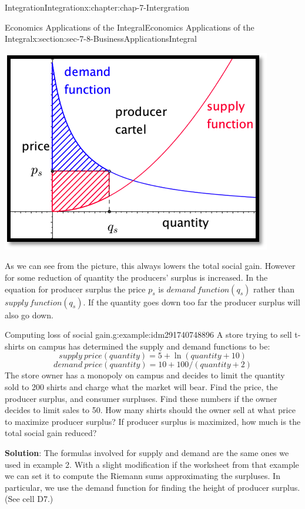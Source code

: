 \documentclass[oneside,10pt,]{book}
\newcommand{\terminology}[1]{\textbf{#1}}
\numberwithin{equation}{section}
\begin{document}
\begin{chapterptx}{Integration}{}{Integration}{}{}{x:chapter:chap-7-Intergration}
\begin{sectionptx}{Economics Applications of the Integral}{}{Economics Applications of the Integral}{}{}{x:section:sec-7-8-BusinessApplicationsIntegral}
\begin{sidebyside}{1}{0.2}{0.2}{0}
\begin{sbspanel}{0.6}
\includegraphics[width=\linewidth]{images/sec7-8-9.png}
\end{sbspanel}%
\end{sidebyside}%
\par
As we can see from the picture, this always lowers the total social gain.  However for some reduction of quantity the producers’ surplus is increased.  In the equation for producer surplus the price \(p_s\) is \(demand\ function (q_s)\) rather than \(supply\ function (q_s)\).  If the quantity goes down too far the producer surplus will also go down.%
\begin{example}{Computing loss of social gain.}{g:example:idm291740748896}%
A store trying to sell t-shirts on campus has determined the supply and demand functions to be:%
%
\begin{equation*}
supply\ price(quantity)=5+\ln (quantity+10)
\end{equation*}
%
\begin{equation*}
demand\ price(quantity)=10+100/(quantity+2)
\end{equation*}
The store owner has a monopoly on campus and decides to limit the quantity sold to 200 shirts and charge what the market will bear.  Find the price, the producer surplus, and consumer surpluses.  Find these numbers if the owner decides to limit sales to 50.   How many shirts should the owner sell at what price to maximize producer surplus?  If producer surplus is maximized, how much is the total social gain reduced?%
\par
\terminology{Solution}: The formulas involved for supply and demand are the same ones we used in example 2.  With a slight modification if the worksheet from that example we can set it to compute the Riemann sums approximating the surpluses.  In particular, we use the demand function for finding the height of producer surplus.  (See cell D7.)%

\end{example}
\end{sectionptx}
\end{chapterptx}
\end{document}
